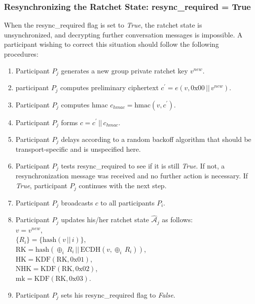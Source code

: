 \documentclass[%
preprint,
amsmath,amssymb,
aps,
prb,
floatfix,
]{revtex4-1}
\begin{document}
\subsubsection{\label{sec:sendresync}Resynchronizing the Ratchet State:
resync\_required = True}
When the resync\_required flag is set to \textit{True}, the ratchet state is
unsynchronized, and decrypting further conversation messages is impossible.
A participant wishing to correct this situation should follow the following
procedures:
\begin{enumerate}
\item Participant $P_j$ generates a new group private ratchet key $v^{new}$.
\item participant $P_j$ computes preliminary ciphertext $c^\prime = e(v, 0\mathrm{x}00
\, || \, v^{new})$.
\item Participant $P_j$ computes hmac $c_{hmac} = \mathrm{hmac}(v, c^\prime)$.
\item Participant $P_j$ forms $c = c^\prime \, || \, c_{hmac}$.
\item Participant $P_j$ delays according to a random backoff algorithm
that should be transport-specific and is unspecified here.
\item Participant $P_j$ tests resync\_required to see if it is still
\textit{True}. If not, a resynchronization message was received and no further
action is necessary. If \textit{True}, participant $P_j$ continues with the next
step.
\item Participant $P_j$ broadcasts $c$ to all participants $P_i$.
\item Participant $P_j$ updates his/her ratchet state
$\mathcal{\hat{A}}_j$ as follows:\\
$v = v^{new}$, \\
$\{R_i\} = \{ \mathrm{hash}(v \, || \, i)\}$, \\
$\mathrm{RK} = \mathrm{hash}(\oplus_i \, R_i \, || \, \mathrm{ECDH}(v, \oplus_i
\, R_i))$, \\
$\mathrm{HK} = \mathrm{KDF}(\mathrm{RK}, 0\mathrm{x}01)$, \\
$\mathrm{NHK} = \mathrm{KDF}(\mathrm{RK}, 0\mathrm{x}02)$, \\
$\mathrm{mk} = \mathrm{KDF}(\mathrm{RK}, 0\mathrm{x}03)$.
\item Participant $P_j$ sets his resync\_required flag to \textit{False}.

\end{enumerate}
\end{document}
